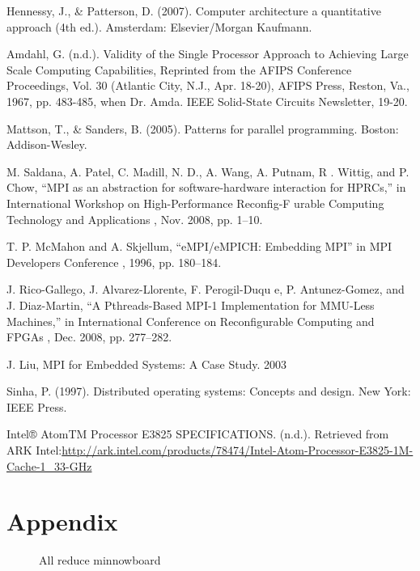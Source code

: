 \documentclass[a4paper]{article}
\begin{document}
\begin{thebibliography}{} 
    
     Hennessy, J., \&  Patterson, D.
    (2007). Computer architecture a quantitative approach (4th ed.). Amsterdam:
    Elsevier/Morgan Kaufmann.
        
     Amdahl, G. (n.d.). Validity of the Single Processor Approach to
    Achieving Large Scale Computing Capabilities, Reprinted from the AFIPS
    Conference Proceedings, Vol. 30 (Atlantic City, N.J., Apr. 18-20), AFIPS
    Press, Reston, Va., 1967, pp. 483-485, when Dr. Amda. IEEE Solid-State
    Circuits Newsletter, 19-20.
        
     Mattson, T., \& Sanders, B. (2005). Patterns for parallel
    programming. Boston: Addison-Wesley.

     M. Saldana, A. Patel, C. Madill, N. D., A. Wang, A. Putnam, R
    . Wittig, and P. Chow, “MPI as an abstraction for software-hardware
    interaction for HPRCs,” in International Workshop on High-Performance
    Reconfig-F urable Computing Technology and Applications , Nov. 2008, pp.
    1–10.

     T. P. McMahon and A. Skjellum, “eMPI/eMPICH: Embedding MPI” in
    MPI Developers Conference , 1996, pp. 180–184.
    
     J. Rico-Gallego, J. Alvarez-Llorente, F. Perogil-Duqu e, P.
    Antunez-Gomez, and J. Diaz-Martin, “A Pthreads-Based MPI-1 Implementation
    for MMU-Less Machines,” in International Conference on Reconfigurable
    Computing and FPGAs , Dec. 2008, pp. 277–282.

     J. Liu, MPI for Embedded Systems: A Case Study. 2003

    Sinha, P. (1997). Distributed operating systems: Concepts and
    design. New York: IEEE Press.

    Intel® AtomTM Processor E3825 SPECIFICATIONS. (n.d.).
    Retrieved from ARK
    Intel:\url{http://ark.intel.com/products/78474/Intel-Atom-Processor-E3825-1M-Cache-1_33-GHz}

\end{thebibliography}


\newpage 
    \section{Appendix} 
    \label{sec:allreduce_minnow} 
    \begin{figure}[htp]
        \centering{ 
            } 
        \caption{All reduce minnowboard} 
    \end{figure}
\end{document}
